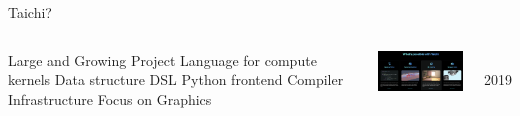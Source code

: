 \begin{frame}{Taichi?}
\begin{columns}
\centering
\begin{outline}
  \1 Large and Growing Project
  \1 Language for compute kernels
  \1 Data structure DSL
  \1 Python frontend
  \1 Compiler Infrastructure
  \1 Focus on Graphics
\end{outline}
\vspace{0.5cm}
\includegraphics[width=5.5cm]{taichi_lang_whats_possible.png} 
\centering

\\
2019 \cite{Hu2019}

\end{columns}
\end{frame}
